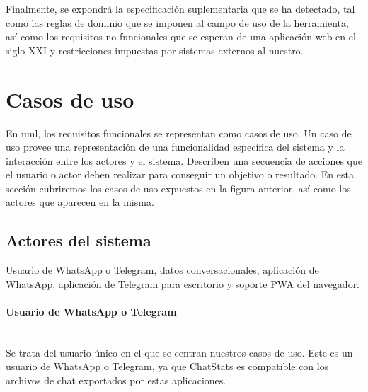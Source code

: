 Finalmente, se expondrá la especificación suplementaria que se ha detectado, tal como  las reglas de dominio que se imponen al campo de uso de la herramienta, así como los requisitos no funcionales que se esperan de una aplicación web en el siglo XXI y restricciones impuestas por sistemas externos al nuestro.

\section{Casos de uso}
\label{sec:use-cases}

En \acrshort{uml}, los requisitos funcionales se representan como casos de uso. Un caso de uso provee una representación de una funcionalidad específica del sistema y la interacción entre los actores y el sistema. Describen una secuencia de acciones que el usuario o actor deben realizar para conseguir un objetivo o resultado. En esta sección cubriremos los casos de uso expuestos en la figura anterior, así como los actores que aparecen en la misma.


\subsection{Actores del sistema}
\label{subsec:system-actors}


Usuario de WhatsApp o Telegram, datos conversacionales, aplicación de WhatsApp, aplicación de Telegram para escritorio y soporte PWA del navegador.

\paragraph{Usuario de WhatsApp o Telegram}\mbox{}\\

Se trata del usuario único en el que se centran nuestros casos de uso. Este es un usuario de WhatsApp o Telegram, ya que ChatStats es compatible con los archivos de chat exportados por estas aplicaciones.

